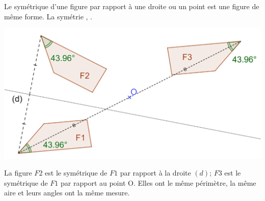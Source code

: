 \documentclass[xcolor={dvipsnames}]{beamer}
\begin{document}
\begin{frame}
	\begin{myprop}
		Le symétrique d'une figure par rapport à une droite ou un point est une figure de même forme. La symétrie , .\pause
	\end{myprop}
	
	\begin{myex}
		\begin{center}
			\includegraphics[scale=0.1]{sym_figures}
		\end{center}
		
		La figure $F2$ est le symétrique de $F1$ par rapport à la droite $(d)$; $F3$ est le symétrique de $F1$ par rapport au point O.\pause
		Elles ont le même périmètre, la même aire et leurs angles ont la même mesure.
	\end{myex}
\end{frame}
\end{document}
